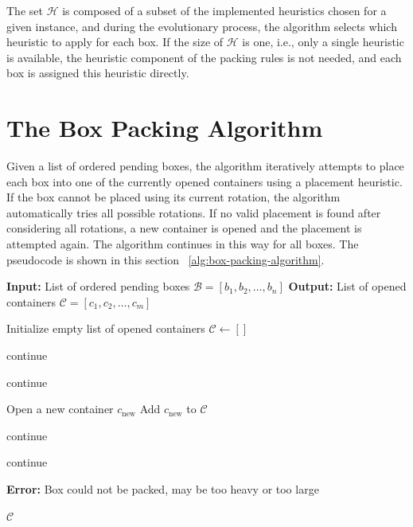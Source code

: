The set $\mathcal{H}$ is composed of a subset of the implemented heuristics chosen for a given instance, and during the evolutionary process, the algorithm selects which heuristic to apply for each box. 
If the size of $\mathcal{H}$ is one, i.e., only a single heuristic is available, the heuristic component of the packing rules is not needed, 
and each box is assigned this heuristic directly.

\section{The Box Packing Algorithm}

Given a list of ordered pending boxes, the algorithm iteratively attempts to place each box into one of the currently opened containers using a placement heuristic. 
If the box cannot be placed using its current rotation, the algorithm automatically tries all possible rotations. 
If no valid placement is found after considering all rotations, a new container is opened and the placement is attempted again. 
The algorithm continues in this way for all boxes. 
The pseudocode is shown in this section ~\ref{alg:box-packing-algorithm}.

\begin{algorithm}[htbp]
\centering
\begin{minipage}{0.95\linewidth}
\begin{algorithmic}[1]
\State \textbf{Input:} List of ordered pending boxes $\mathcal{B} = [b_1, b_2, \dots, b_n]$
\State \textbf{Output:} List of opened containers $\mathcal{C} = [c_1, c_2, \dots, c_m]$

\State Initialize empty list of opened containers $\mathcal{C} \gets []$


        \State continue
    \EndIf

        \State continue
    \EndIf

    \State Open a new container $c_{\text{new}}$
    \State Add $c_{\text{new}}$ to $\mathcal{C}$

        \State continue
    \EndIf

        \State continue
    \EndIf

    \State \textbf{Error:} Box could not be packed, may be too heavy or too large
\EndFor

\State \Return $\mathcal{C}$
\end{algorithmic}
\end{minipage}
\caption{Box Packing Algorithm Pseudocode}
\label{alg:box-packing-algorithm}
\end{algorithm}





